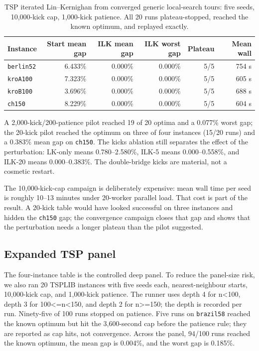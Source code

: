 \documentclass[pdflatex,sn-mathphys-num]{sn-jnl}
\begin{document}
\begin{table}[t]
\centering
\caption{TSP iterated Lin--Kernighan from converged generic local-search tours: five seeds, 10,000-kick cap,
1,000-kick patience. All 20 runs plateau-stopped, reached the known optimum, and replayed exactly.}
\label{tab:tsp-ilk}
\small
\begin{tabular}{lrrrrr}
\toprule
Instance & Start mean gap & ILK mean gap & ILK worst gap & Plateau & Mean wall \\
\midrule
\texttt{berlin52} & 6.433\% & 0.000\% & 0.000\% & 5/5 & 754 s \\
\texttt{kroA100} & 7.323\% & 0.000\% & 0.000\% & 5/5 & 605 s \\
\texttt{kroB100} & 3.696\% & 0.000\% & 0.000\% & 5/5 & 688 s \\
\texttt{ch150} & 8.229\% & 0.000\% & 0.000\% & 5/5 & 604 s \\
\bottomrule
\end{tabular}
\end{table}

A 2,000-kick/200-patience pilot reached 19 of 20 optima and a 0.077\% worst gap; the 20-kick pilot
reached the optimum on three of four instances (15/20 runs) and a 0.383\% mean gap on \texttt{ch150}. The kicks ablation still separates the
effect of the perturbation: LK-only means 0.780--2.580\%, ILK-5 means 0.000--0.558\%, and ILK-20 means
0.000--0.383\%. The double-bridge kicks are material, not a cosmetic restart.

The 10,000-kick-cap campaign is deliberately expensive: mean wall time per seed is roughly 10--13 minutes
under 20-worker parallel load. That cost is part of the result. A 20-kick table would have looked
successful on three instances and hidden the \texttt{ch150} gap; the convergence campaign closes that
gap and shows that the perturbation needs a longer plateau than the pilot suggested.

\subsection{Expanded TSP panel}

The four-instance table is the controlled deep panel. To reduce the panel-size risk, we also ran 20
TSPLIB instances with five seeds each, nearest-neighbour starts, 10,000-kick cap, and 1,000-kick
patience. The runner uses depth 4 for n<100, depth 3 for 100<=n<150, and depth 2 for n>=150; the
depth is recorded per run. Ninety-five of 100 runs stopped on patience. Five runs on
\texttt{brazil58} reached the known optimum but hit the 3,600-second cap before the patience rule;
they are reported as cap hits, not convergence. Across the panel, 94/100 runs reached the known
optimum, the mean gap is 0.004\%, and the worst gap is 0.185\%.
\end{document}
